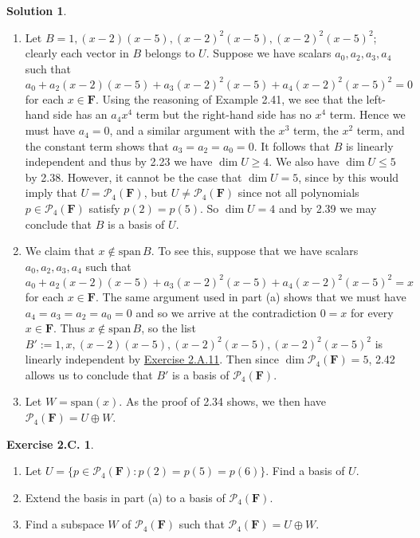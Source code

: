 \documentclass[12pt]{article}
\theoremstyle{definition}
\theoremstyle{exercise}
\newtheorem{exercise}{Exercise 2.C.}
\theoremstyle{solution}
\newtheorem*{solution}{Solution}
\newcommand{\poly}{\mathcal{P}}
\newcommand{\Span}{\text{span}}
\newcommand{\F}{\mathbf{F}}
\begin{document}
\begin{solution}
    \begin{enumerate}
        \item Let \( B = 1, (x - 2)(x - 5), (x - 2)^2 (x - 5), (x - 2)^2 (x - 5)^2 \); clearly each vector in \( B \) belongs to \( U \). Suppose we have scalars \( a_0, a_2, a_3, a_4 \) such that
        \[
            a_0 + a_2 (x - 2)(x - 5) + a_3 (x - 2)^2 (x - 5) + a_4 (x - 2)^2 (x - 5)^2 = 0
        \]
        for each \( x \in \F \). Using the reasoning of Example 2.41, we see that the left-hand side has an \( a_4 x^4 \) term but the right-hand side has no \( x^4 \) term. Hence we must have \( a_4 = 0 \), and a similar argument with the \( x^3 \) term, the \( x^2 \) term, and the constant term shows that \( a_3 = a_2 = a_0 = 0 \). It follows that \( B \) is linearly independent and thus by 2.23 we have \( \dim U \geq 4 \). We also have \( \dim U \leq 5 \) by 2.38. However, it cannot be the case that \( \dim U = 5 \), since by  this would imply that \( U = \poly_4(\F) \), but \( U \neq \poly_4(\F) \) since not all polynomials \( p \in \poly_4(\F) \) satisfy \( p(2) = p(5) \). So \( \dim U = 4 \) and by 2.39 we may conclude that \( B \) is a basis of \( U \).

        \item We claim that \( x \not\in \Span\,B \). To see this, suppose that we have scalars \( a_0, a_2, a_3, a_4 \) such that
        \[
            a_0 + a_2 (x - 2)(x - 5) + a_3 (x - 2)^2 (x - 5) + a_4 (x - 2)^2 (x - 5)^2 = x
        \]
        for each \( x \in \F \). The same argument used in part (a) shows that we must have \( a_4 = a_3 = a_2 = a_0 = 0 \) and so we arrive at the contradiction \( 0 = x \) for every \( x \in \F \). Thus \( x \not\in \Span\,B \), so the list \( B' := 1, x, (x - 2)(x - 5), (x - 2)^2 (x - 5), (x - 2)^2 (x - 5)^2 \) is linearly independent by \href{https://lew98.github.io/Mathematics/LADR_Section_2_A_Exercises.pdf}{Exercise 2.A.11}. Then since \( \dim \poly_4(\F) = 5 \), 2.42 allows us to conclude that \( B' \) is a basis of \( \poly_4(\F) \).

        \item Let \( W = \Span(x) \). As the proof of 2.34 shows, we then have \( \poly_4(\F) = U \oplus W \).
    \end{enumerate}
\end{solution}

\begin{exercise}
\label{ex:7}
    \begin{enumerate}
        \item Let \( U = \{ p \in \poly_4(\F) : p(2) = p(5) = p(6) \} \). Find a basis of \( U \).

        \item Extend the basis in part (a) to a basis of \( \poly_4(\F) \).

        \item Find a subspace \( W \) of \( \poly_4(\F) \) such that \( \poly_4(\F) = U \oplus W \).
    \end{enumerate}
\end{exercise}
    
\end{document}
